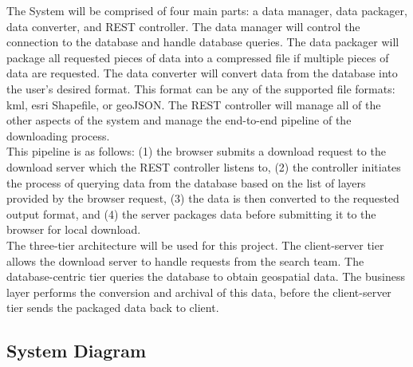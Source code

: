 \documentclass{article}
\begin{document}
	The System will be comprised of four main parts: a data manager, data packager, data converter, and REST controller. The data manager will control the connection to the database and handle database queries. The data packager will package all requested pieces of data into a compressed file if multiple pieces of data are requested. The data converter will convert data from the database into the user's desired format. This format can be any of the supported file formats: kml, esri Shapefile, or geoJSON. The REST controller will manage all of the other aspects of the system and manage the end-to-end pipeline of the downloading process. \\
	
	This pipeline is as follows: (1) the browser submits a download request to the download server which the REST controller listens to, (2) the controller initiates the process of querying data from the database based on the list of layers provided by the browser request, (3) the data is then converted to the requested output format, and (4) the server packages data before submitting it to the browser for local download. \\ 
	
	The three-tier architecture will be used for this project. The client-server tier allows the download server to handle requests from the search team. The database-centric tier queries the database to obtain geospatial data. The business layer performs the conversion and archival of this data, before the client-server tier sends the packaged data back to client.   
	
	\subsection{System Diagram}
\end{document}
